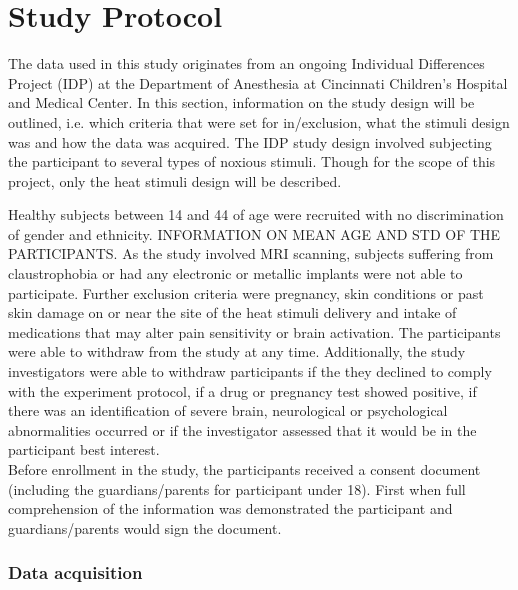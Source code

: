 \section{Study Protocol}
The data used in this study originates from an ongoing Individual Differences Project (IDP) at the Department of Anesthesia at Cincinnati Children’s Hospital and Medical Center. In this section, information on the study design will be outlined, i.e. which criteria that were set for in/exclusion, what the stimuli design was and how the data was acquired. The IDP study design involved subjecting the participant to several types of noxious stimuli. Though for the scope of this project, only the heat stimuli design will be described. 

Healthy subjects between 14 and 44 of age were recruited with no discrimination of gender and ethnicity. INFORMATION ON MEAN AGE AND STD OF THE PARTICIPANTS. As the study involved MRI scanning, subjects suffering from claustrophobia or had any electronic or metallic implants were not able to participate. Further exclusion criteria were pregnancy, skin conditions or past skin damage on or near the site of the heat stimuli delivery and intake of medications that may alter pain sensitivity or brain activation. The participants were able to withdraw from the study at any time. Additionally, the study investigators were able to withdraw participants if the they declined to comply with the experiment protocol, if a drug or pregnancy test showed positive, if there was an identification of severe brain, neurological or psychological abnormalities occurred or if the investigator assessed that it would be in the participant best interest. \\
Before enrollment in the study, the participants received a consent document (including the guardians/parents for participant under 18). First when full comprehension of the information was demonstrated the participant and guardians/parents would sign the document.

\subsubsection{Data acquisition} \label{ac}

